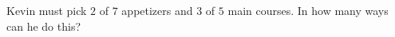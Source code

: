 Kevin must pick $2$ of $7$ appetizers and $3$ of $5$ main courses. In how many ways can he do this?
